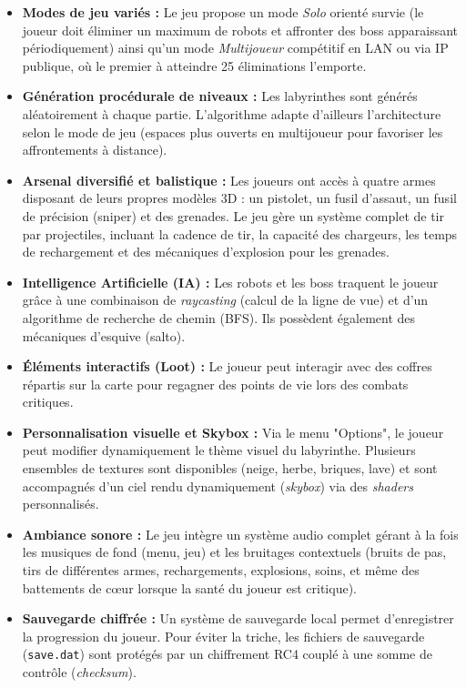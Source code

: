 \documentclass[a4paper,11pt]{article}
\begin{document}
\begin{itemize}
    \item \textbf{Modes de jeu variés :} Le jeu propose un mode \emph{Solo} orienté survie (le joueur doit éliminer un maximum de robots et affronter des boss apparaissant périodiquement) ainsi qu'un mode \emph{Multijoueur} compétitif en LAN ou via IP publique, où le premier à atteindre 25 éliminations l'emporte.
    \item \textbf{Génération procédurale de niveaux :} Les labyrinthes sont générés aléatoirement à chaque partie. L'algorithme adapte d'ailleurs l'architecture selon le mode de jeu (espaces plus ouverts en multijoueur pour favoriser les affrontements à distance).
    \item \textbf{Arsenal diversifié et balistique :} Les joueurs ont accès à quatre armes disposant de leurs propres modèles 3D : un pistolet, un fusil d'assaut, un fusil de précision (sniper) et des grenades. Le jeu gère un système complet de tir par projectiles, incluant la cadence de tir, la capacité des chargeurs, les temps de rechargement et des mécaniques d'explosion pour les grenades.
    \item \textbf{Intelligence Artificielle (IA) :} Les robots et les boss traquent le joueur grâce à une combinaison de \emph{raycasting} (calcul de la ligne de vue) et d'un algorithme de recherche de chemin (BFS). Ils possèdent également des mécaniques d'esquive (salto).
    \item \textbf{Éléments interactifs (Loot) :} Le joueur peut interagir avec des coffres répartis sur la carte pour regagner des points de vie lors des combats critiques.
    \item \textbf{Personnalisation visuelle et Skybox :} Via le menu "Options", le joueur peut modifier dynamiquement le thème visuel du labyrinthe. Plusieurs ensembles de textures sont disponibles (neige, herbe, briques, lave) et sont accompagnés d'un ciel rendu dynamiquement (\emph{skybox}) via des \emph{shaders} personnalisés.
    \item \textbf{Ambiance sonore :} Le jeu intègre un système audio complet gérant à la fois les musiques de fond (menu, jeu) et les bruitages contextuels (bruits de pas, tirs de différentes armes, rechargements, explosions, soins, et même des battements de cœur lorsque la santé du joueur est critique).
    \item \textbf{Sauvegarde chiffrée :} Un système de sauvegarde local permet d'enregistrer la progression du joueur. Pour éviter la triche, les fichiers de sauvegarde (\texttt{save.dat}) sont protégés par un chiffrement RC4 couplé à une somme de contrôle (\emph{checksum}).
\end{itemize}
\end{document}
